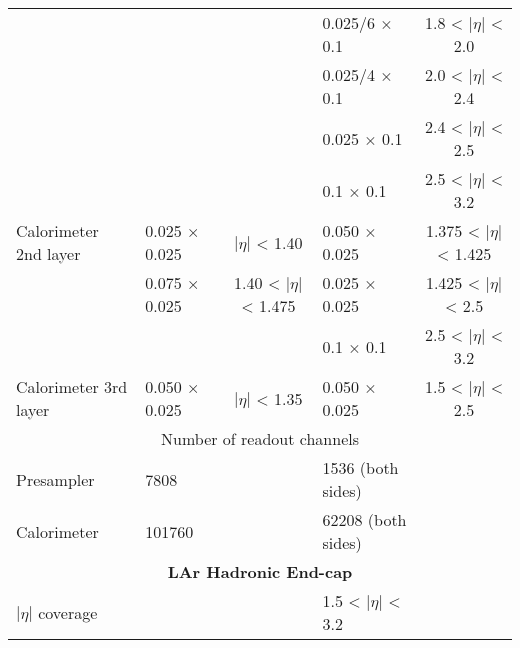 \begin{table}[]
\begin{tabular}{|l|lc|lc|}
                                               &                   &                                    & 0.025/6 × 0.1                   & 1.8 < $|\eta|$ < 2.0     \\
                                               &                   &                                    & 0.025/4 × 0.1                   & 2.0 < $|\eta|$ < 2.4     \\
                                               &                   &                                    & 0.025 × 0.1                     & 2.4 < $|\eta|$ < 2.5     \\
                                               &                   &                                    & 0.1 × 0.1                       & 2.5 < $|\eta|$ < 3.2     \\
\hline 
Calorimeter 2nd layer                          & 0.025 × 0.025     & $|\eta|$ < 1.40                    & 0.050 × 0.025                   & 1.375 < $|\eta|$ < 1.425 \\
                                               & 0.075 × 0.025     & 1.40 < $|\eta|$ < 1.475 & 0.025 × 0.025                              & 1.425 < $|\eta|$ < 2.5   \\
                                               &                   &                                    & 0.1 × 0.1                       & 2.5 < $|\eta|$ < 3.2     \\
\hline 
Calorimeter 3rd layer                          & 0.050 × 0.025     & $|\eta|$ < 1.35                 & 0.050 × 0.025                   & 1.5 < $|\eta|$ < 2.5     \\
\hline 
                                               \multicolumn{5}{|c|}{Number of readout channels} \\
\hline 
Presampler                                     & 7808              &                                    & 1536 (both sides)               &                                     \\
Calorimeter                                    & 101760            &                                    & 62208 (both sides)              &                                     \\
\hline 
                                               \multicolumn{5}{|c|}{\textbf{LAr Hadronic End-cap}} \\
\hline 
$|\eta|$ coverage                              &                   &                                    & 1.5 < $|\eta|$ < 3.2 &                                     \\

\end{tabular}
\end{table}
